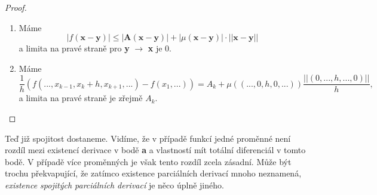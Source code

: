\documentclass[../main.tex]{subfiles}
\begin{document}
\begin{proof}
	\begin{enumerate}
		\item Máme \[|f(\textbf{x}-\textbf{y})| \leq |\textbf{A}(\textbf{x}-\textbf{y})| + |\mu(\textbf{x}-\textbf{y})|\cdot||\textbf{x}-\textbf{y}||\]
		a limita na pravé straně pro \textbf{y} $\rightarrow$ \textbf{x} je 0.
		\item Máme \[\frac{1}{h}(f(..., x_{k-1},x_k+h,x_{k+1},...) - f(x_1,...)) = A_k + \mu((...,0,h,0,...))\frac{||(0,...,h,...,0)||}{h},\]
		a limita na pravé straně je zřejmě $A_k$.
	\end{enumerate}
\end{proof}

Teď již spojitost dostaneme. Vidíme, že v případě funkcí jedné proměnné není rozdíl mezi existencí derivace v bodě \textbf{a} a vlastností
mít totální diferenciál v tomto bodě. V případě více proměnných je však tento rozdíl zcela zásadní. Může být trochu překvapující, že 
zatímco existence parciálních derivací mnoho neznamená, \textit{existence spojitých parciálních derivací} je něco úplně jiného.
\end{document}
